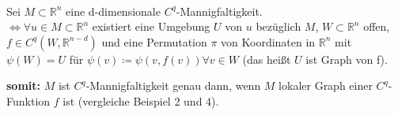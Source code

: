 \begin{satz}
\mbox{} \\
Sei $M \subset \mathbb{R}^{n}$ eine d-dimensionale $C^{q}$-Mannigfaltigkeit. \\
$\Longleftrightarrow \forall u \in M \subset \mathbb{R}^n $ existiert eine Umgebung
$U$ von $u$  bezüglich $M$, $W \subset \mathbb{R}^n $ offen, 
$f \in C^q (W, \mathbb{R}^{n-d})$ und eine Permutation $\pi$ von Koordinaten in
$\mathbb{R}^n $ mit $ \psi (W) = U $ für $ \psi (v) \coloneqq \psi (v, f(v)) 
\forall v \in W $ (das heißt $U$ ist Graph von f).
\end{satz}

\textbf{somit:} $M$ ist $C^q$-Mannigfaltigkeit genau dann, wenn $M$ lokaler Graph
einer $C^q$-Funktion $f$ ist (vergleiche Beispiel 2 und 4).

